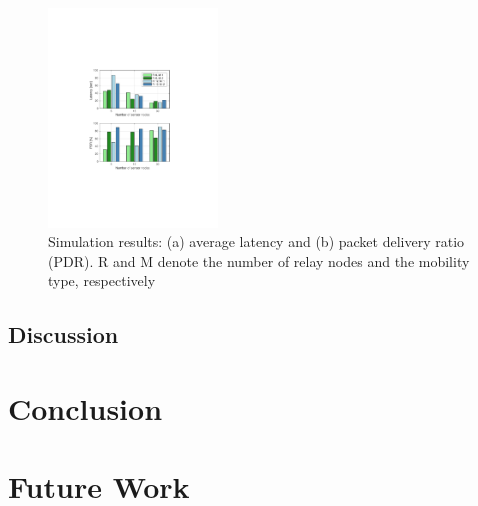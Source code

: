 \documentclass[conference]{IEEEtran}
\begin{document}
\begin{figure}
    \centering
    \includegraphics[trim= 150 200 150 200, clip, width=0.4\textwidth]{figure_barplot.pdf}
    \caption{Simulation results: (a) average latency and (b) packet delivery ratio (PDR). 
    R and M denote the number of relay nodes and the mobility type, respectively}
    \label{fig:results_bar}
\end{figure}

\subsection{Discussion}

\section{Conclusion}

\section{Future Work}


%
%
\end{document}
